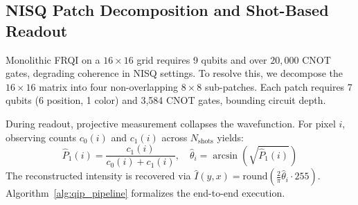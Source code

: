 \documentclass[12pt,onecolumn,draftclsnofoot]{IEEEtran}
\begin{document}
\subsection{NISQ Patch Decomposition and Shot-Based Readout}
Monolithic FRQI on a $16\times16$ grid requires 9 qubits and over $20,000$ CNOT gates, degrading coherence in NISQ settings. To resolve this, we decompose the $16\times16$ matrix into four non-overlapping $8\times8$ sub-patches. Each patch requires 7 qubits (6 position, 1 color) and 3,584 CNOT gates, bounding circuit depth.

During readout, projective measurement collapses the wavefunction. For pixel $i$, observing counts $c_0(i)$ and $c_1(i)$ across $N_{\text{shots}}$ yields:
\begin{equation}
\hat{P}_1(i) = \frac{c_1(i)}{c_0(i) + c_1(i)}, \quad \hat{\theta}_i = \arcsin\left(\sqrt{\hat{P}_1(i)}\right)
\end{equation}
The reconstructed intensity is recovered via $\hat{I}(y, x) = \text{round}\left(\frac{2}{\pi} \hat{\theta}_i \cdot 255\right)$. Algorithm~\ref{alg:qip_pipeline} formalizes the end-to-end execution.
\end{document}
